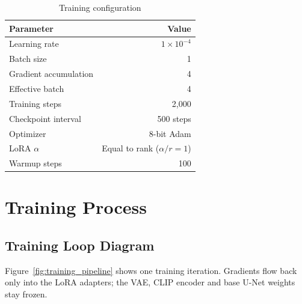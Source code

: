\documentclass[11pt]{article}
\begin{document}
\begin{table}[!htbp]
\centering
\caption{Training configuration}
\begin{tabular}{lr}
\toprule
Parameter & Value \\
\midrule
Learning rate & $1 \times 10^{-4}$ \\
Batch size & 1 \\
Gradient accumulation & 4 \\
Effective batch & 4 \\
Training steps & 2,000 \\
Checkpoint interval & 500 steps \\
Optimizer & 8-bit Adam \\
LoRA $\alpha$ & Equal to rank ($\alpha/r = 1$) \\
Warmup steps & 100 \\
\bottomrule
\end{tabular}
\end{table}

\section{Training Process}

\subsection{Training Loop Diagram}

Figure~\ref{fig:training_pipeline} shows one training iteration. Gradients flow back only into the LoRA adapters; the VAE, CLIP encoder and base U-Net weights stay frozen.
\end{document}
